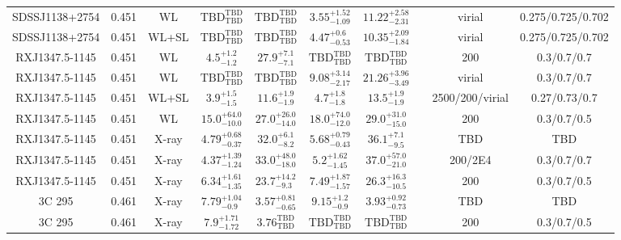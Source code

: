 \begin{table}
\begin{tabular}{cccccccccc}
SDSSJ1138+2754 & 0.451 & WL & ${\mathrm{TBD}}^{\mathrm{TBD}}_{\mathrm{TBD}}$ & ${\mathrm{TBD}}^{\mathrm{TBD}}_{\mathrm{TBD}}$ & ${3.55}^{+1.52}_{-1.09}$ & ${11.22}^{+2.58}_{-2.31}$ & \citet{OG12.1} & virial & 0.275/0.725/0.702 \\
SDSSJ1138+2754 & 0.451 & WL+SL & ${\mathrm{TBD}}^{\mathrm{TBD}}_{\mathrm{TBD}}$ & ${\mathrm{TBD}}^{\mathrm{TBD}}_{\mathrm{TBD}}$ & ${4.47}^{+0.6}_{-0.53}$ & ${10.35}^{+2.09}_{-1.84}$ & \citet{OG12.1} & virial & 0.275/0.725/0.702 \\
RXJ1347.5-1145 & 0.451 & WL & ${4.5}^{+1.2}_{-1.2}$ & ${27.9}^{+7.1}_{-7.1}$ & ${\mathrm{TBD}}^{\mathrm{TBD}}_{\mathrm{TBD}}$ & ${\mathrm{TBD}}^{\mathrm{TBD}}_{\mathrm{TBD}}$ & \citet{SE14.1} & 200 & 0.3/0.7/0.7 \\
RXJ1347.5-1145 & 0.451 & WL & ${\mathrm{TBD}}^{\mathrm{TBD}}_{\mathrm{TBD}}$ & ${\mathrm{TBD}}^{\mathrm{TBD}}_{\mathrm{TBD}}$ & ${9.08}^{+3.14}_{-2.17}$ & ${21.26}^{+3.96}_{-3.49}$ & \citet{UM11.1} & virial & 0.3/0.7/0.7 \\
RXJ1347.5-1145 & 0.451 & WL+SL & ${3.9}^{+1.5}_{-1.5}$ & ${11.6}^{+1.9}_{-1.9}$ & ${4.7}^{+1.8}_{-1.8}$ & ${13.5}^{+1.9}_{-1.9}$ & \citet{ME14.1} & 2500/200/virial & 0.27/0.73/0.7 \\
RXJ1347.5-1145 & 0.451 & WL & ${15.0}^{+64.0}_{-10.0}$ & ${27.0}^{+26.0}_{-14.0}$ & ${18.0}^{+74.0}_{-12.0}$ & ${29.0}^{+31.0}_{-15.0}$ & \citet{KL05.1} & 200 & 0.3/0.7/0.5 \\
RXJ1347.5-1145 & 0.451 & X-ray & ${4.79}^{+0.68}_{-0.37}$ & ${32.0}^{+6.1}_{-8.2}$ & ${5.68}^{+0.79}_{-0.43}$ & ${36.1}^{+7.1}_{-9.5}$ & \citet{SC06.1} & TBD & TBD \\
RXJ1347.5-1145 & 0.451 & X-ray & ${4.37}^{+1.39}_{-1.24}$ & ${33.0}^{+48.0}_{-18.0}$ & ${5.2}^{+1.62}_{-1.45}$ & ${37.0}^{+57.0}_{-21.0}$ & \citet{VO06.1} & 200/2E4 & 0.3/0.7/0.7 \\
RXJ1347.5-1145 & 0.451 & X-ray & ${6.34}^{+1.61}_{-1.35}$ & ${23.7}^{+14.2}_{-9.3}$ & ${7.49}^{+1.87}_{-1.57}$ & ${26.3}^{+16.3}_{-10.5}$ & \citet{AL03.1} & 200 & 0.3/0.7/0.5 \\
3C 295 & 0.461 & X-ray & ${7.79}^{+1.04}_{-0.9}$ & ${3.57}^{+0.81}_{-0.65}$ & ${9.15}^{+1.2}_{-0.9}$ & ${3.93}^{+0.92}_{-0.73}$ & \citet{SC06.1} & TBD & TBD \\
3C 295 & 0.461 & X-ray & ${7.9}^{+1.71}_{-1.72}$ & ${3.76}^{\mathrm{TBD}}_{\mathrm{TBD}}$ & ${\mathrm{TBD}}^{\mathrm{TBD}}_{\mathrm{TBD}}$ & ${\mathrm{TBD}}^{\mathrm{TBD}}_{\mathrm{TBD}}$ & \citet{AL03.1} & 200 & 0.3/0.7/0.5 \\

\end{tabular}
\end{table}
